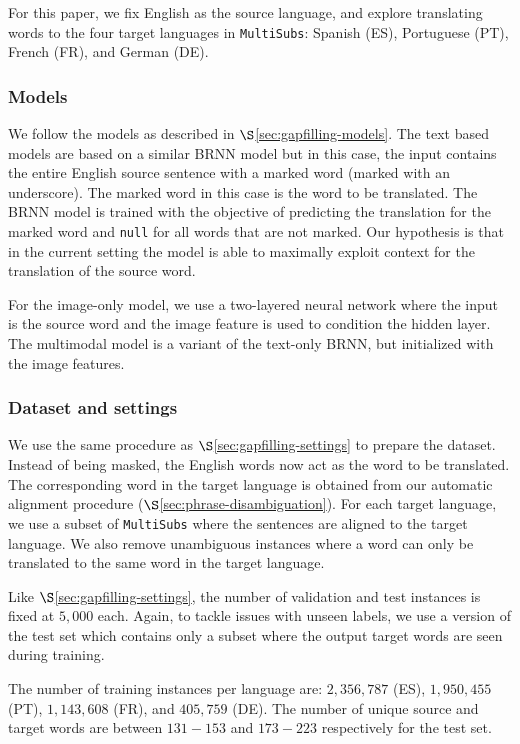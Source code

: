 \documentclass[twocolumn]{svjour3}          \smartqed  \usepackage{graphicx}
\newcommand{\multisubs}{\texttt{MultiSubs}\xspace}
\begin{document}
For this paper, we fix English as the source language, and explore translating words to the four target languages in \multisubs: Spanish (ES), Portuguese (PT), French (FR), and German (DE). 

\subsubsection{Models}
\label{sec:mlt-models}
We follow the models as described in $\S$\ref{sec:gapfilling-models}. The text based models are based on a similar BRNN model but in this case, the input contains the entire English source sentence with a marked word (marked with an underscore). The marked word in this case is the word to be translated. The BRNN model is trained with the objective of predicting the translation for the marked word and \texttt{null} for all words that are not marked. Our hypothesis is that in the current setting the model is able to maximally exploit context for the translation of the source word. 

For the image-only model, we use a two-layered neural network where the input is the source word and the image feature is used to condition the hidden layer. 
The multimodal model is a variant of the text-only BRNN, but initialized with the image features.

\subsubsection{Dataset and settings}
\label{sec:mlt-dataset}

We use the same procedure as $\S$\ref{sec:gapfilling-settings} to prepare the dataset. Instead of being masked, the English words now act as the word to be translated. The corresponding word in the target language is obtained from our automatic alignment procedure ($\S$\ref{sec:phrase-disambiguation}). For each target language, we use a subset of \multisubs where the sentences are aligned to the target language. We also remove unambiguous instances where a word can only be translated to the same word in the target language. 

Like $\S$\ref{sec:gapfilling-settings}, the number of validation and test instances is fixed at $5,000$ each. Again, to tackle issues with unseen labels, we use a version of the test set which contains only a subset where the output target words are seen during training.

The number of training instances per language are: $2,356,787$ (ES), $1,950,455$ (PT), $1,143,608$ (FR), and $405,759$ (DE). The number of unique source and target words are between $131-153$ and $173-223$ respectively for the test set.
\end{document}
